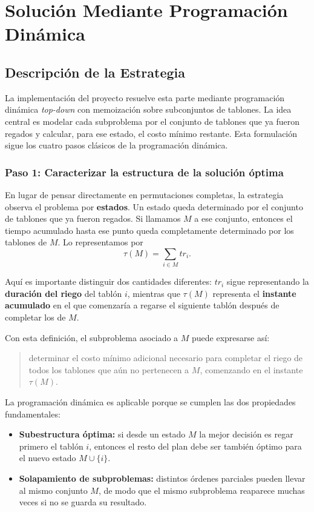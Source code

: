 \documentclass[12pt,a4paper]{article}
\begin{document}
\section{Soluci\'on Mediante Programaci\'on Din\'amica}

\subsection{Descripci\'on de la Estrategia}

La implementaci\'on del proyecto resuelve esta parte mediante programaci\'on din\'amica \emph{top-down} con memoizaci\'on sobre subconjuntos de tablones. La idea central es modelar cada subproblema por el conjunto de tablones que ya fueron regados y calcular, para ese estado, el costo m\'inimo restante. Esta formulaci\'on sigue los cuatro pasos cl\'asicos de la programaci\'on din\'amica.

\subsubsection{Paso 1: Caracterizar la estructura de la soluci\'on \'optima}

En lugar de pensar directamente en permutaciones completas, la estrategia observa el problema por \textbf{estados}. Un estado queda determinado por el conjunto de tablones que ya fueron regados. Si llamamos \(M\) a ese conjunto, entonces el tiempo acumulado hasta ese punto queda completamente determinado por los tablones de \(M\). Lo representamos por
\[
\tau(M)=\sum_{i \in M} tr_i.
\]

Aqu\'i es importante distinguir dos cantidades diferentes: \(tr_i\) sigue representando la \textbf{duraci\'on del riego} del tabl\'on \(i\), mientras que \(\tau(M)\) representa el \textbf{instante acumulado} en el que comenzar\'ia a regarse el siguiente tabl\'on despu\'es de completar los de \(M\).

Con esta definici\'on, el subproblema asociado a \(M\) puede expresarse as\'i:

\begin{quote}
determinar el costo m\'inimo adicional necesario para completar el riego de todos los tablones que a\'un no pertenecen a \(M\), comenzando en el instante \(\tau(M)\).
\end{quote}

La programaci\'on din\'amica es aplicable porque se cumplen las dos propiedades fundamentales:
\begin{itemize}
  \item \textbf{Subestructura \'optima:} si desde un estado \(M\) la mejor decisi\'on es regar primero el tabl\'on \(i\), entonces el resto del plan debe ser tambi\'en \'optimo para el nuevo estado \(M \cup \{i\}\).
  \item \textbf{Solapamiento de subproblemas:} distintos \'ordenes parciales pueden llevar al mismo conjunto \(M\), de modo que el mismo subproblema reaparece muchas veces si no se guarda su resultado.
\end{itemize}
\end{document}
